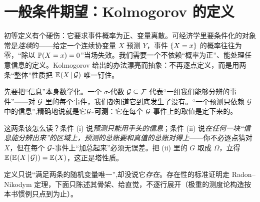 \section{一般条件期望：Kolmogorov 的定义}
\label{sec:condexp-kolmogorov}

初等定义有个硬伤：它要求事件概率为正、变量离散。可经济学里要条件化的对象常是\emph{连续}的——给定一个连续协变量 $X$ 预测 $Y$，事件 $\left\{X=x\right\}$ 的概率往往为零，``除以 $\mathbb{P}\!\left(X=x\right)=0$''当场失效。我们需要一个不依赖``概率为正''、能处理任意信息的定义。Kolmogorov 给出的办法漂亮而抽象：不再逐点定义，而是用两条``整体''性质把 $\mathbb{E}_{}\!\left(X\,\middle|\,\mathcal{G}\right)$ 唯一钉住。

先要把``信息''本身数学化。一个 $\sigma$-代数 $\mathcal{G}\subseteq\mathcal{F}$ 代表``一组我们能够分辨的事件''——对 $\mathcal{G}$ 里的每个事件，我们都知道它到底发生了没有。``一个预测只依赖 $\mathcal{G}$ 中的信息'',精确地说就是它\textbf{$\mathcal{G}$-可测}：它在每个 $\mathcal{G}$-事件上的取值是定下来的。


这两条该怎么读？条件 (i) 说\emph{预测只能用手头的信息}；条件 (ii) 说\emph{在任何一块``信息能分辨出来''的区域上，预测的总账要和真值的总账对得上}——你不必逐点猜对 $X$，但在每个 $\mathcal{G}$-事件上``加总起来''必须无误差。把 (ii) 里的 $G$ 取成 $\Omega$，立得 $\mathbb{E}_{}\!\left(\mathbb{E}_{}\!\left(X\,\middle|\,\mathcal{G}\right)\right)=\mathbb{E}_{}\!\left(X\right)$，这正是塔性质。


定义只说``满足两条的随机变量唯一'',却没说它\emph{存在}。存在性的标准证明走 Radon--Nikodym 定理，下面只陈述其骨架、给直觉，不逐行展开（极重的测度论构造按本书惯例只点到为止）。


